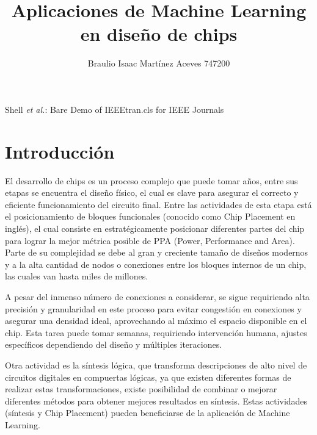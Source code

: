 \documentclass[journal]{IEEEtran}
\begin{document}
\title{Aplicaciones de Machine Learning en diseño de chips}

\author {Braulio Isaac Martínez Aceves 747200
        }%
        
{Shell \MakeLowercase{\textit{et al.}}: Bare Demo of IEEEtran.cls for IEEE Journals}

\maketitle


\section{Introducción}

El desarrollo de chips es un proceso complejo que puede tomar años, entre sus etapas se encuentra el diseño físico, el cual es clave para asegurar el correcto y eficiente funcionamiento del circuito final. Entre las actividades de esta etapa está el posicionamiento de bloques funcionales (conocido como Chip Placement en inglés), el cual consiste en estratégicamente posicionar diferentes partes del chip para lograr la mejor métrica posible de PPA (Power, Performance and Area). Parte de su complejidad se debe al gran y creciente tamaño de diseños modernos y a la alta cantidad de nodos o conexiones entre los bloques internos de un chip, las cuales van hasta miles de millones.

A pesar del inmenso número de conexiones a considerar, se sigue requiriendo alta precisión y granularidad en este proceso para evitar congestión en conexiones y asegurar una densidad ideal, aprovechando al máximo el espacio disponible en el chip. Esta tarea puede tomar semanas, requiriendo intervención humana, ajustes específicos dependiendo del diseño y múltiples iteraciones.

Otra actividad es la síntesis lógica, que transforma descripciones de alto nivel de circuitos digitales en compuertas lógicas, ya que existen diferentes formas de realizar estas transformaciones, existe posibilidad de combinar o mejorar diferentes métodos para obtener mejores resultados en síntesis. Estas actividades (síntesis y Chip Placement) pueden beneficiarse de la aplicación de Machine Learning.
\end{document}
